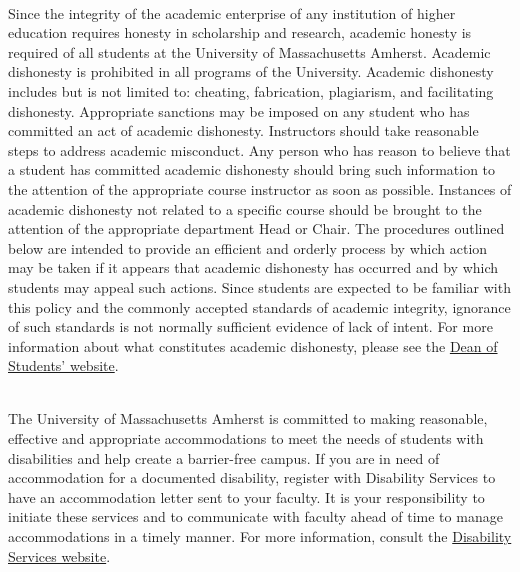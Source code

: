 \documentclass[10pt]{article}
\begin{document}
  
\bigskip
{} \\ 
Since the integrity of the academic enterprise of any institution of higher education requires honesty in scholarship and research, academic honesty is required of all students at the University of Massachusetts Amherst. Academic dishonesty is prohibited in all programs of the University. Academic dishonesty includes but is not limited to: cheating, fabrication, plagiarism, and facilitating dishonesty. Appropriate sanctions may be imposed on any student who has committed an act of academic dishonesty. Instructors should take reasonable steps to address academic misconduct. Any person who has reason to believe that a student has committed academic dishonesty should bring such information to the attention of the appropriate course instructor as soon as possible. Instances of academic dishonesty not related to a specific course should be brought to the attention of the appropriate department Head or Chair. The procedures outlined below are intended to provide an efficient and orderly process by which action may be taken if it appears that academic dishonesty has occurred and by which students may appeal such actions. Since students are expected to be familiar with this policy and the commonly accepted standards of academic integrity, ignorance of such standards is not normally sufficient evidence of lack of intent.
For more information about what constitutes academic dishonesty, please see the \href{http://umass.edu/dean_students/codeofconduct/acadhonesty/}{Dean of Students' website}.


\bigskip
{} \\ 
The University of Massachusetts Amherst is committed to making reasonable, effective and appropriate accommodations to meet the needs of students with disabilities and help create a barrier-free campus. If you are in need of accommodation for a documented disability, register with Disability Services to have an accommodation letter sent to your faculty. It is your responsibility to initiate these services and to communicate with faculty ahead of time to manage accommodations in a timely manner. For more information, consult the \href{http://www.umass.edu/disability/}{Disability Services website}.
\end{document}
